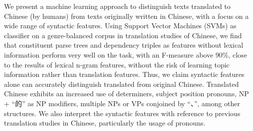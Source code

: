 We present a machine learning approach to distinguish texts translated to Chinese (by humans) from texts originally written in Chinese, with a focus on a wide range of syntactic features. Using Support Vector Machines (SVMs) as classifier on a genre-balanced corpus in translation studies of Chinese, we find that constituent parse trees and dependency triples as features without lexical information perform very well on the task, with an F-measure above 90\%, close to the results of lexical n-gram features, without the risk of learning topic information rather than translation features. Thus, we claim syntactic features alone can accurately distinguish translated  from original Chinese. Translated Chinese exhibits an increased use of determiners, subject position pronouns, NP + ``的'' as NP modifiers, multiple NPs or VPs conjoined by ``、'', among other structures. We also interpret the syntactic features with reference to previous translation studies in Chinese, particularly the usage of pronouns.
